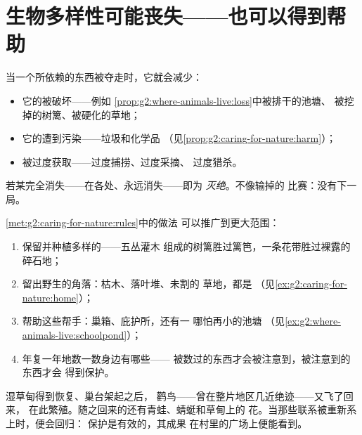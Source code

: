 \section{生物多样性可能丧失——也可以得到帮助}

\begin{proposition}[多样性如何丧失]\label{prop:g5:biodiversity:loss}
当一个所依赖的东西被夺走时，它就会减少：
\begin{itemize}
  \item 它的\emph{}被破坏——例如
        \cref{prop:g2:where-animals-live:loss}中被排干的池塘、
        被挖掉的树篱、被硬化的草地；
  \item 它的遭到污染——垃圾和化学品
        （见\cref{prop:g2:caring-for-nature:harm}）；
  \item 被过度获取——过度捕捞、过度采摘、
        过度猎杀。
\end{itemize}
若某完全消失——在各处、永远消失——即为
\emph{灭绝}。不像输掉的
比赛：没有下一局。
\end{proposition}
\admitted

\begin{method}\label{met:g5:biodiversity:help}
\cref{met:g2:caring-for-nature:rules}中的做法
可以推广到更大范围：
\begin{enumerate}
  \item 保留并种植多样的——五丛灌木
        组成的树篱胜过篱笆，一条花带胜过裸露的碎石地；
  \item 留出野生的角落：枯木、落叶堆、未割的
        草地，都是
        （见\cref{ex:g2:caring-for-nature:home}）；
  \item 帮助这些帮手：巢箱、庇护所，还有一
        哪怕再小的池塘
        （见\cref{ex:g2:where-animals-live:schoolpond}）；
  \item 年复一年地数一数身边有哪些——
        被数过的东西才会被注意到，被注意到的东西才会
        得到保护。
\end{enumerate}
\end{method}

\begin{example}[鹳鸟的回归]\label{ex:g5:biodiversity:storks}
湿草甸得到恢复、巢台架起之后，
鹳鸟——曾在整片地区几近绝迹——又飞了回来，
在此繁殖。随之回来的还有青蛙、蜻蜓和草甸上的
花。当那些联系被重新系上时，便会回归：
保护是有效的，其成果
在村里的广场上便能看到。
\end{example}

